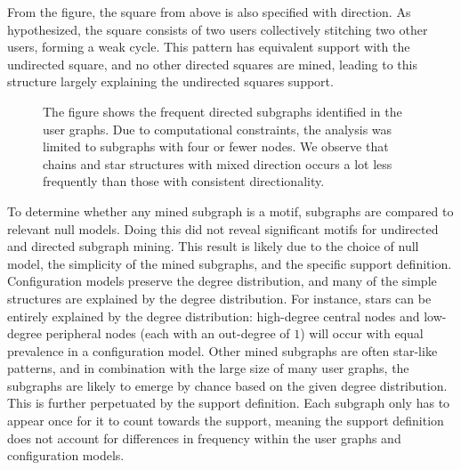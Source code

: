 From the figure, the square from above is also specified with direction. As hypothesized, the square consists of two users collectively stitching two other users, forming a weak cycle. This pattern has equivalent support with the undirected square, and no other directed squares are mined, leading to this structure largely explaining the undirected squares support. 

\begin{figure}[h]
    \centering
    \begin{adjustwidth}{-\textwidth}{-\textwidth}
        \centering
        
    \end{adjustwidth}
    \caption{The figure shows the frequent directed subgraphs identified in the user graphs. Due to computational constraints, the analysis was limited to subgraphs with four or fewer nodes.
    We observe that chains and star structures with mixed direction occurs a lot less frequently than those with consistent directionality.} 
    \label{fig:directed_subgraphs}
\end{figure}


To determine whether any mined subgraph is a motif, subgraphs are compared to relevant null models. Doing this did not reveal significant motifs for undirected and directed subgraph mining. This result is likely due to the choice of null model, the simplicity of the mined subgraphs, and the specific support definition. Configuration models preserve the degree distribution, and many of the simple structures are explained by the degree distribution. For instance, stars can be entirely explained by the degree distribution: high-degree central nodes and low-degree peripheral nodes (each with an out-degree of $1$) will occur with equal prevalence in a configuration model. Other mined subgraphs are often star-like patterns, and in combination with the large size of many user graphs, the subgraphs are likely to emerge by chance based on the given degree distribution. This is further perpetuated by the support definition. Each subgraph only has to appear once for it to count towards the support, meaning the support definition does not account for differences in frequency within the user graphs and configuration models.   



